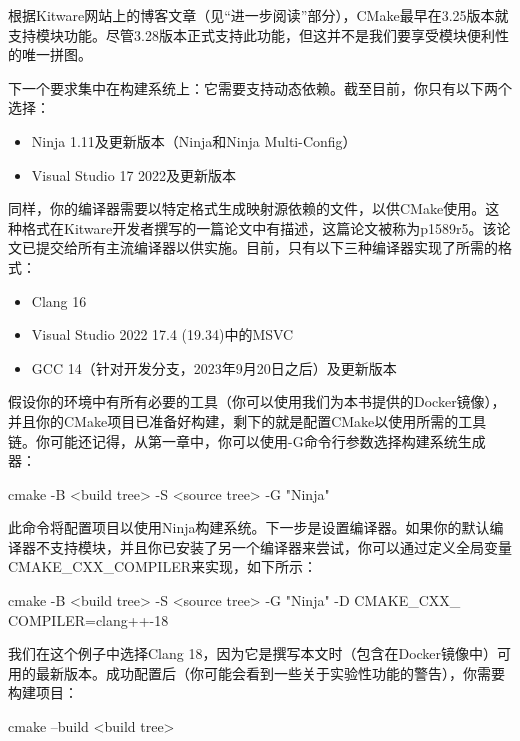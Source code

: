 
根据Kitware网站上的博客文章（见“进一步阅读”部分），CMake最早在3.25版本就支持模块功能。尽管3.28版本正式支持此功能，但这并不是我们要享受模块便利性的唯一拼图。

下一个要求集中在构建系统上：它需要支持动态依赖。截至目前，你只有以下两个选择：

\begin{itemize}
\item
Ninja 1.11及更新版本（Ninja和Ninja Multi-Config）

\item
Visual Studio 17 2022及更新版本
\end{itemize}

同样，你的编译器需要以特定格式生成映射源依赖的文件，以供CMake使用。这种格式在Kitware开发者撰写的一篇论文中有描述，这篇论文被称为p1589r5。该论文已提交给所有主流编译器以供实施。目前，只有以下三种编译器实现了所需的格式：

\begin{itemize}
\item
Clang 16

\item
Visual Studio 2022 17.4 (19.34)中的MSVC

\item
GCC 14（针对开发分支，2023年9月20日之后）及更新版本
\end{itemize}

假设你的环境中有所有必要的工具（你可以使用我们为本书提供的Docker镜像），并且你的CMake项目已准备好构建，剩下的就是配置CMake以使用所需的工具链。你可能还记得，从第一章中，你可以使用-G命令行参数选择构建系统生成器：

\begin{shell}
cmake -B <build tree> -S <source tree> -G "Ninja"
\end{shell}

此命令将配置项目以使用Ninja构建系统。下一步是设置编译器。如果你的默认编译器不支持模块，并且你已安装了另一个编译器来尝试，你可以通过定义全局变量CMAKE\_CXX\_COMPILER来实现，如下所示：

\begin{shell}
cmake -B <build tree> -S <source tree> -G "Ninja" -D CMAKE_CXX_ COMPILER=clang++-18
\end{shell}

我们在这个例子中选择Clang 18，因为它是撰写本文时（包含在Docker镜像中）可用的最新版本。成功配置后（你可能会看到一些关于实验性功能的警告），你需要构建项目：

\begin{shell}
cmake --build <build tree>
\end{shell}

